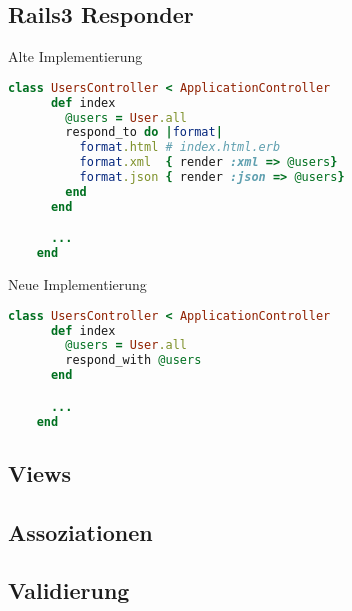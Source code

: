 \subsection{Rails3 Responder}

\begin{frame}[fragile]{Alte Implementierung}
  \begin{lstlisting}[language=Ruby,gobble=4,basicstyle=\ttfamily\small]
    class UsersController < ApplicationController
      def index
        @users = User.all
        respond_to do |format|
          format.html # index.html.erb
          format.xml  { render :xml => @users}
          format.json { render :json => @users}
        end
      end

      ...
    end
  \end{lstlisting}
\end{frame}

\begin{frame}[fragile]{Neue Implementierung}
  \begin{lstlisting}[language=Ruby,gobble=4,basicstyle=\ttfamily\small]
    class UsersController < ApplicationController
      def index
        @users = User.all
        respond_with @users
      end

      ...
    end
  \end{lstlisting}
\end{frame}

\subsection{Views}


\subsection{Assoziationen}


\subsection{Validierung}



